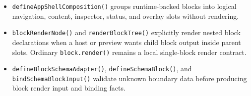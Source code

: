 \begin{itemize}
shortcut cues, progress, grouping, explainability, documents, links, dividers, text entry, choices, navigation, disclosure, path progress, brand emphasis, mode-aware primitives, dense comparisons, hierarchies, exploration lists, and temporal dependency views. Their render functions now produce deterministic first-proof output across interactive, static, pipe, and accessible modes while keeping provider lifecycle, command dispatch, and production AppShell behavior out of the block definition layer.
\item
  \texttt{d\allowbreak{}e\allowbreak{}f\allowbreak{}i\allowbreak{}n\allowbreak{}e\allowbreak{}A\allowbreak{}p\allowbreak{}p\allowbreak{}S\allowbreak{}h\allowbreak{}e\allowbreak{}l\allowbreak{}l\allowbreak{}C\allowbreak{}o\allowbreak{}m\allowbreak{}p\allowbreak{}o\allowbreak{}s\allowbreak{}i\allowbreak{}t\allowbreak{}i\allowbreak{}o\allowbreak{}n\allowbreak{}(\allowbreak{})} groups runtime-backed blocks into logical navigation, content, inspector, status, and overlay slots without rendering.
\item
  \texttt{b\allowbreak{}l\allowbreak{}o\allowbreak{}c\allowbreak{}k\allowbreak{}R\allowbreak{}e\allowbreak{}n\allowbreak{}d\allowbreak{}e\allowbreak{}r\allowbreak{}N\allowbreak{}o\allowbreak{}d\allowbreak{}e\allowbreak{}(\allowbreak{})} and \texttt{r\allowbreak{}e\allowbreak{}n\allowbreak{}d\allowbreak{}e\allowbreak{}r\allowbreak{}B\allowbreak{}l\allowbreak{}o\allowbreak{}c\allowbreak{}k\allowbreak{}T\allowbreak{}r\allowbreak{}e\allowbreak{}e\allowbreak{}(\allowbreak{})} explicitly render nested block declarations when a host or preview wants child block output inside parent slots. Ordinary \texttt{b\allowbreak{}l\allowbreak{}o\allowbreak{}c\allowbreak{}k\allowbreak{}.\allowbreak{}r\allowbreak{}e\allowbreak{}n\allowbreak{}d\allowbreak{}e\allowbreak{}r\allowbreak{}(\allowbreak{})} remains a local single-block render contract.
\item
  \texttt{d\allowbreak{}e\allowbreak{}f\allowbreak{}i\allowbreak{}n\allowbreak{}e\allowbreak{}B\allowbreak{}l\allowbreak{}o\allowbreak{}c\allowbreak{}k\allowbreak{}S\allowbreak{}c\allowbreak{}h\allowbreak{}e\allowbreak{}m\allowbreak{}a\allowbreak{}A\allowbreak{}d\allowbreak{}a\allowbreak{}p\allowbreak{}t\allowbreak{}e\allowbreak{}r\allowbreak{}(\allowbreak{})}, \texttt{d\allowbreak{}e\allowbreak{}f\allowbreak{}i\allowbreak{}n\allowbreak{}e\allowbreak{}S\allowbreak{}c\allowbreak{}h\allowbreak{}e\allowbreak{}m\allowbreak{}a\allowbreak{}B\allowbreak{}l\allowbreak{}o\allowbreak{}c\allowbreak{}k\allowbreak{}(\allowbreak{})}, and \texttt{b\allowbreak{}i\allowbreak{}n\allowbreak{}d\allowbreak{}S\allowbreak{}c\allowbreak{}h\allowbreak{}e\allowbreak{}m\allowbreak{}a\allowbreak{}B\allowbreak{}l\allowbreak{}o\allowbreak{}c\allowbreak{}k\allowbreak{}I\allowbreak{}n\allowbreak{}p\allowbreak{}u\allowbreak{}t\allowbreak{}(\allowbreak{})} validate unknown boundary data before producing block render input and binding facts.

\end{itemize}
